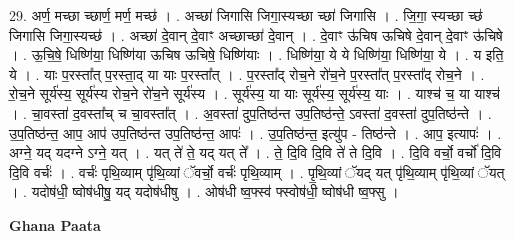 \documentclass[17pt]{extarticle}
\begin{document}
29. अर्ण॒ मच्छा च्छार्ण॒ मर्ण॒ मच्छ॑ । . अच्छा॑ जिगासि जिगा॒स्यच्छा च्छा॑ जिगासि । . जि॒गा॒ स्यच्छा च्छ॑ जिगासि जिगा॒स्यच्छ॑ । . अच्छा॑ दे॒वान् दे॒वाꣳ अच्छाच्छा॑ दे॒वान् । . दे॒वाꣳ ऊ॑चिष ऊचिषे दे॒वान् दे॒वाꣳ ऊ॑चिषे । . ऊ॒चि॒षे॒ धिष्णि॑या॒ धिष्णि॑या ऊचिष ऊचिषे॒ धिष्णि॑याः । . धिष्णि॑या॒ ये ये धिष्णि॑या॒ धिष्णि॑या॒ ये । . य इति॒ ये । . याः प॒रस्ता᳚त् प॒रस्ता॒द् या याः प॒रस्ता᳚त् । . प॒रस्ता᳚द् रोच॒ने रो॑च॒ने प॒रस्ता᳚त् प॒रस्ता᳚द् रोच॒ने । . रो॒च॒ने सूर्य॑स्य॒ सूर्य॑स्य रोच॒ने रो॑च॒ने सूर्य॑स्य । . सूर्य॑स्य॒ या याः सूर्य॑स्य॒ सूर्य॑स्य॒ याः । . याश्च॑ च॒ या याश्च॑ । . चा॒वस्ता॑ द॒वस्ता᳚च् च चा॒वस्ता᳚त् । . अ॒वस्ता॑ दुप॒तिष्ठ॑न्त उप॒तिष्ठ॑न्ते॒ ऽवस्ता॑ द॒वस्ता॑ दुप॒तिष्ठ॑न्ते । . उ॒प॒तिष्ठ॑न्त॒ आप॒ आप॑ उप॒तिष्ठ॑न्त उप॒तिष्ठ॑न्त॒ आपः॑ । . उ॒प॒तिष्ठ॑न्त॒ इत्यु॑प - तिष्ठ॑न्ते । . आप॒ इत्यापः॑ । . अग्ने॒ यद् यदग्ने ऽग्ने॒ यत् । . यत् ते॑ ते॒ यद् यत् ते᳚ । . ते॒ दि॒वि दि॒वि ते॑ ते दि॒वि । . दि॒वि वर्चो॒ वर्चो॑ दि॒वि दि॒वि वर्चः॑ । . वर्चः॑ पृथि॒व्याम् पृ॑थि॒व्यां ॅवर्चो॒ वर्चः॑ पृथि॒व्याम् । . पृ॒थि॒व्यां ॅयद् यत् पृ॑थि॒व्याम् पृ॑थि॒व्यां ॅयत् । . यदोष॑धी॒ ष्वोष॑धीषु॒ यद् यदोष॑धीषु । . ओष॑धी ष्व॒फ्स्व॑ फ्स्वोष॑धी॒ ष्वोष॑धी ष्व॒फ्सु । \newline

\textbf{Ghana Paata } \newline
\end{document}
